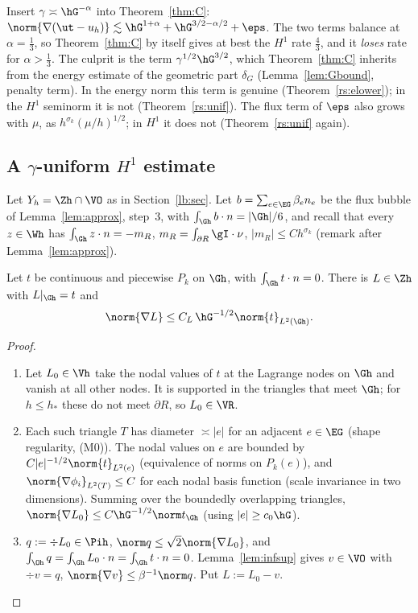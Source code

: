 Insert $\gamma\asymp\hG^{-\alpha}$ into Theorem~\ref{thm:C}: $\norm{\nabla(\ut-u_h)}\lesssim\hG^{1+\alpha}+\hG^{3/2-\alpha/2}+\eps$. The two terms balance at $\alpha=\frac13$, so Theorem~\ref{thm:C} by itself gives at best the $H^1$ rate $\frac43$, and it \emph{loses} rate for $\alpha>\frac13$. The culprit is the term $\gamma^{1/2}\hG^{3/2}$, which Theorem~\ref{thm:C} inherits from the energy estimate of the geometric part $\delta_G$ (Lemma~\ref{lem:Gbound}, penalty term). In the energy norm this term is genuine (Theorem~\ref{rs:elower}); in the $H^1$ seminorm it is not (Theorem~\ref{rs:unif}). The flux term of $\eps$ also grows with $\mu$, as $h^{\sigma_k}(\mu/h)^{1/2}$; in $H^1$ it does not (Theorem~\ref{rs:unif} again).

\subsection{A \texorpdfstring{$\gamma$}{gamma}-uniform \texorpdfstring{$H^1$}{H1} estimate}

Let $Y_h=\Zh\cap\VO$ as in Section~\ref{lb:sec}. Let $b=\sum_{e\in\EG}\beta_en_e$ be the flux bubble of Lemma~\ref{lem:approx}, step~3, with $\int_{\Gh}b\cdot n=|\Gh|/6$, and recall that every $z\in\Wh$ has $\int_{\Gh}z\cdot n=-m_R$, $m_R=\int_{\partial R}\gI\cdot\nu$, $|m_R|\le Ch^{\sigma_k}$ (remark after Lemma~\ref{lem:approx}).

\begin{lemma}\label{rs:lift}
Let $t$ be continuous and piecewise $P_k$ on $\Gh$, with $\int_{\Gh}t\cdot n=0$. There is $L\in\Zh$ with $L|_{\Gh}=t$ and
\[
\norm{\nabla L}\le C_L\,\hG^{-1/2}\norm{t}_{L^2(\Gh)} .
\]
\end{lemma}

\begin{proof}
\begin{enumerate}
\item Let $L_0\in\Vh$ take the nodal values of $t$ at the Lagrange nodes on $\Gh$ and vanish at all other nodes. It is supported in the triangles that meet $\Gh$; for $h\le h_\ast$ these do not meet $\partial R$, so $L_0\in\VR$.
\item Each such triangle $T$ has diameter $\asymp|e|$ for an adjacent $e\in\EG$ (shape regularity, (M0)). The nodal values on $e$ are bounded by $C|e|^{-1/2}\norm{t}_{L^2(e)}$ (equivalence of norms on $P_k(e)$), and $\norm{\nabla\phi_i}_{L^2(T)}\le C$ for each nodal basis function (scale invariance in two dimensions). Summing over the boundedly overlapping triangles, $\norm{\nabla L_0}\le C\hG^{-1/2}\norm t_{\Gh}$ (using $|e|\ge c_0\hG$).
\item $q:=\div L_0\in\Pih$, $\norm q\le\sqrt2\norm{\nabla L_0}$, and $\int_{\Oh}q=\int_{\Gh}L_0\cdot n=\int_{\Gh}t\cdot n=0$. Lemma~\ref{lem:infsup} gives $v\in\VO$ with $\div v=q$, $\norm{\nabla v}\le\beta^{-1}\norm q$. Put $L:=L_0-v$.\qedhere
\end{enumerate}
\end{proof}

